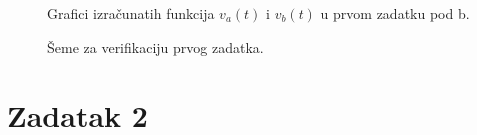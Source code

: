 \documentclass{article}
\begin{document}
                \begin{figure}[H]
                    \begin{center}
                        
                    \end{center}
                    \caption{Grafici izračunatih funkcija $v_a(t)$ i $v_b(t)$ u prvom zadatku pod b.}
                    \label{MPL1b}
                \end{figure}
                \begin{figure}[H]
                    \centering
                    \hfill
                    \caption{Šeme za verifikaciju prvog zadatka.}
                    \label{PSpice1}
                \end{figure}
    
        \newpage
        \section{Zadatak 2}
\end{document}
